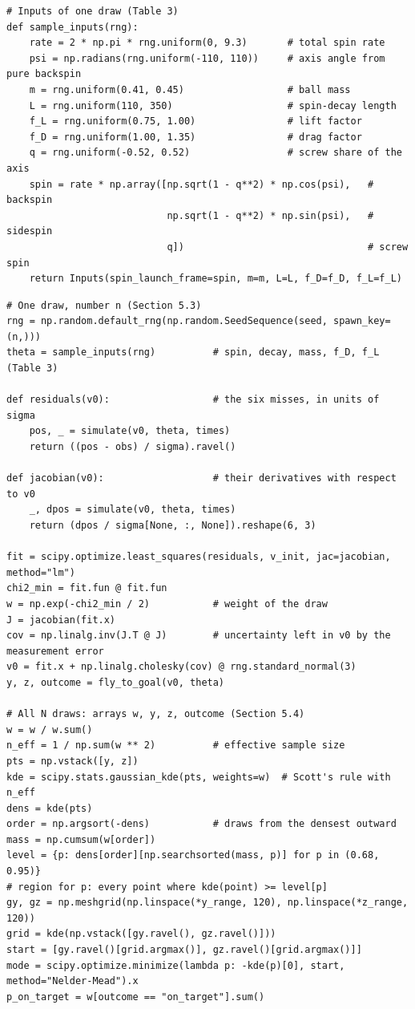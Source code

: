 \documentclass[10pt,a4paper]{article}
\begin{document}
\begin{lstlisting}[caption={Coefficients, acceleration and input sampling (standard model). Units are SI; spin is in rad/s.}, label=lst:physics, captionpos=b]
# Inputs of one draw (Table 3)
def sample_inputs(rng):
    rate = 2 * np.pi * rng.uniform(0, 9.3)       # total spin rate
    psi = np.radians(rng.uniform(-110, 110))     # axis angle from pure backspin
    m = rng.uniform(0.41, 0.45)                  # ball mass
    L = rng.uniform(110, 350)                    # spin-decay length
    f_L = rng.uniform(0.75, 1.00)                # lift factor
    f_D = rng.uniform(1.00, 1.35)                # drag factor
    q = rng.uniform(-0.52, 0.52)                 # screw share of the axis
    spin = rate * np.array([np.sqrt(1 - q**2) * np.cos(psi),   # backspin
                            np.sqrt(1 - q**2) * np.sin(psi),   # sidespin
                            q])                                # screw spin
    return Inputs(spin_launch_frame=spin, m=m, L=L, f_D=f_D, f_L=f_L)
\end{lstlisting}

\begin{lstlisting}[caption={Core of the Monte Carlo method: one draw, then the summary of all draws.}, label=lst:mc, captionpos=b]
# One draw, number n (Section 5.3)
rng = np.random.default_rng(np.random.SeedSequence(seed, spawn_key=(n,)))
theta = sample_inputs(rng)          # spin, decay, mass, f_D, f_L (Table 3)

def residuals(v0):                  # the six misses, in units of sigma
    pos, _ = simulate(v0, theta, times)
    return ((pos - obs) / sigma).ravel()

def jacobian(v0):                   # their derivatives with respect to v0
    _, dpos = simulate(v0, theta, times)
    return (dpos / sigma[None, :, None]).reshape(6, 3)

fit = scipy.optimize.least_squares(residuals, v_init, jac=jacobian, method="lm")
chi2_min = fit.fun @ fit.fun
w = np.exp(-chi2_min / 2)           # weight of the draw
J = jacobian(fit.x)
cov = np.linalg.inv(J.T @ J)        # uncertainty left in v0 by the measurement error
v0 = fit.x + np.linalg.cholesky(cov) @ rng.standard_normal(3)
y, z, outcome = fly_to_goal(v0, theta)

# All N draws: arrays w, y, z, outcome (Section 5.4)
w = w / w.sum()
n_eff = 1 / np.sum(w ** 2)          # effective sample size
pts = np.vstack([y, z])
kde = scipy.stats.gaussian_kde(pts, weights=w)  # Scott's rule with n_eff
dens = kde(pts)
order = np.argsort(-dens)           # draws from the densest outward
mass = np.cumsum(w[order])
level = {p: dens[order][np.searchsorted(mass, p)] for p in (0.68, 0.95)}
# region for p: every point where kde(point) >= level[p]
gy, gz = np.meshgrid(np.linspace(*y_range, 120), np.linspace(*z_range, 120))
grid = kde(np.vstack([gy.ravel(), gz.ravel()]))
start = [gy.ravel()[grid.argmax()], gz.ravel()[grid.argmax()]]
mode = scipy.optimize.minimize(lambda p: -kde(p)[0], start, method="Nelder-Mead").x
p_on_target = w[outcome == "on_target"].sum()
\end{lstlisting}
\end{document}
